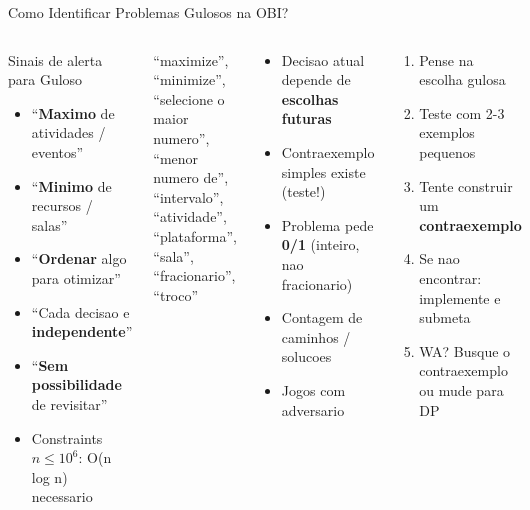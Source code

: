 \documentclass[aspectratio=169,10pt]{beamer}
\begin{document}
\begin{frame}{Como Identificar Problemas Gulosos na OBI?}
  \begin{columns}[t]
      \begin{block}{Sinais de alerta para Guloso}
        \begin{itemize}\footnotesize
          \item ``\textbf{Maximo} de atividades / eventos''
          \item ``\textbf{Minimo} de recursos / salas''
          \item ``\textbf{Ordenar} algo para otimizar''
          \item ``Cada decisao e \textbf{independente}''
          \item ``\textbf{Sem possibilidade} de revisitar''
          \item Constraints $n \leq 10^6$: O(n log n) necessario
        \end{itemize}
      \end{block}
      \vspace{0.1cm}
      \begin{tcolorbox}[caixaLaranja,title={Palavras-chave tipicas}]
        \footnotesize
        ``maximize'', ``minimize'', ``selecione o maior numero'',
        ``menor numero de'', ``intervalo'', ``atividade'',
        ``plataforma'', ``sala'', ``fracionario'', ``troco''
      \end{tcolorbox}
      \begin{tcolorbox}[caixaVermelho,title={Quando NAO usar Guloso}]
        \begin{itemize}\footnotesize
          \item Decisao atual depende de \textbf{escolhas futuras}
          \item Contraexemplo simples existe (teste!)
          \item Problema pede \textbf{0/1} (inteiro, nao fracionario)
          \item Contagem de caminhos / solucoes
          \item Jogos com adversario
        \end{itemize}
      \end{tcolorbox}
      \vspace{0.1cm}
      \begin{tcolorbox}[caixaDourada,title={Receita para a prova}]
        \footnotesize
        \begin{enumerate}\footnotesize
          \item Pense na escolha gulosa
          \item Teste com 2-3 exemplos pequenos
          \item Tente construir um \textbf{contraexemplo}
          \item Se nao encontrar: implemente e submeta
          \item WA? Busque o contraexemplo ou mude para DP
        \end{enumerate}
      \end{tcolorbox}
  \end{columns}
\end{frame}
\end{document}
